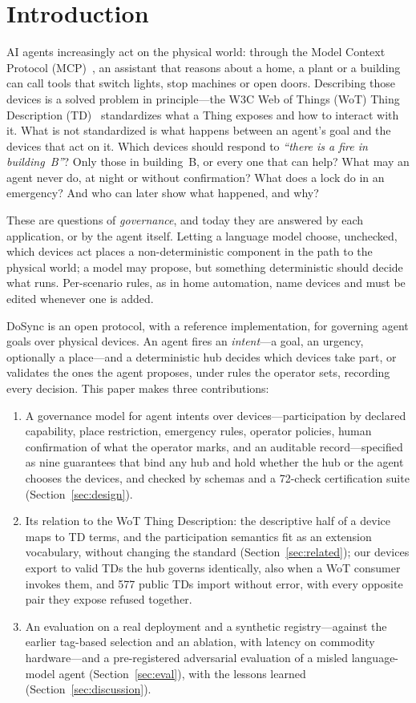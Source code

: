 \documentclass[conference]{IEEEtran}
\begin{document}
\section{Introduction}
AI agents increasingly act on the physical world: through the Model Context Protocol (MCP)~\cite{mcp}, an assistant that reasons about a home, a plant or a building can call tools that switch lights, stop machines or open doors. Describing those devices is a solved problem in principle---the W3C Web of Things (WoT) Thing Description (TD)~\cite{wot-td11} standardizes what a Thing exposes and how to interact with it. What is not standardized is what happens between an agent's goal and the devices that act on it. Which devices should respond to \emph{``there is a fire in building~B''}? Only those in building~B, or every one that can help? What may an agent never do, at night or without confirmation? What does a lock do in an emergency? And who can later show what happened, and why?

These are questions of \emph{governance}, and today they are answered by each application, or by the agent itself. Letting a language model choose, unchecked, which devices act places a non-deterministic component in the path to the physical world; a model may propose, but something deterministic should decide what runs. Per-scenario rules, as in home automation, name devices and must be edited whenever one is added.

DoSync is an open protocol, with a reference implementation, for governing agent goals over physical devices. An agent fires an \emph{intent}---a goal, an urgency, optionally a place---and a deterministic hub decides which devices take part, or validates the ones the agent proposes, under rules the operator sets, recording every decision. This paper makes three contributions:
\begin{enumerate}
\item A governance model for agent intents over devices---participation by declared capability, place restriction, emergency rules, operator policies, human confirmation of what the operator marks, and an auditable record---specified as nine guarantees that bind any hub and hold whether the hub or the agent chooses the devices, and checked by schemas and a 72-check certification suite (Section~\ref{sec:design}).
\item Its relation to the WoT Thing Description: the descriptive half of a device maps to TD terms, and the participation semantics fit as an extension vocabulary, without changing the standard (Section~\ref{sec:related}); our devices export to valid TDs the hub governs identically, also when a WoT consumer invokes them, and 577 public TDs import without error, with every opposite pair they expose refused together.
\item An evaluation on a real deployment and a synthetic registry---against the earlier tag-based selection and an ablation, with latency on commodity hardware---and a pre-registered adversarial evaluation of a misled language-model agent (Section~\ref{sec:eval}), with the lessons learned (Section~\ref{sec:discussion}).
\end{enumerate}
\end{document}
